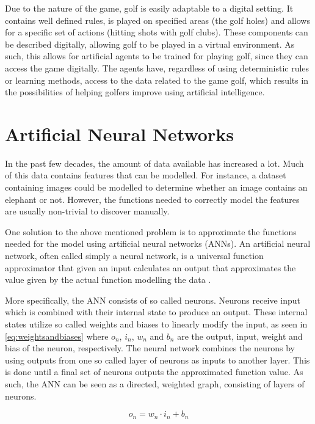 \documentclass{kththesis}
\begin{document}
Due to the nature of the game, golf is easily adaptable to a digital setting. It contains well defined rules, is played on specified areas (the golf holes) and allows for a specific set of actions (hitting shots with golf clubs). These components can be described digitally, allowing golf to be played in a virtual environment. As such, this allows for artificial agents to be trained for playing golf, since they can access the game digitally. The agents have, regardless of using deterministic rules or learning methods, access to the data related to the game golf, which results in the possibilities of helping golfers improve using artificial intelligence.

\section{Artificial Neural Networks}
\label{sec:neuralnetworks}
In the past few decades, the amount of data available has increased a lot. Much of this data contains features that can be modelled. For instance, a dataset containing images could be modelled to determine whether an image contains an elephant or not. However, the functions needed to correctly model the features are usually non-trivial to discover manually.

One solution to the above mentioned problem is to approximate the functions needed for the model using artificial neural networks (ANNs). An artificial neural network, often called simply a neural network, is a universal function approximator that given an input calculates an output that approximates the value given by the actual function modelling the data \parencite{rojas2013neural}. 

More specifically, the ANN consists of so called neurons. Neurons receive input which is combined with their internal state to produce an output. These internal states utilize so called weights and biases to linearly modify the input, as seen in \autoref{eq:weightsandbiases} where $o_n$, $i_n$, $w_n$ and $b_n$ are the output, input, weight and bias of the neuron, respectively. The neural network combines the neurons by using outputs from one so called layer of neurons as inputs to another layer. This is done until a final set of neurons outputs the approximated function value. As such, the ANN can be seen as a directed, weighted graph, consisting of layers of neurons. \parencite{lecun2015deep} 

\begin{equation}
\label{eq:weightsandbiases}
o_n = w_n \cdot i_n + b_n 
\end{equation}
\end{document}

